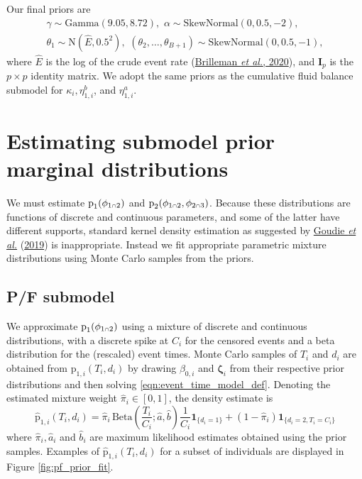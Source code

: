 \documentclass[
  10pt,
  a4paper,
]{article}
\let\Oldcap\cap
\renewcommand{\cap}{\mathrel{\mathsmaller{\Oldcap}}}
\newcommand{\pd}{\text{p}}
\begin{document}
Our final priors are \begin{equation}
\begin{gathered}
  \gamma \sim \text{Gamma}(9.05, 8.72), \, \,
  \alpha \sim \text{SkewNormal}(0, 0.5, -2), \\
  \theta_{1} \sim \text{N}(\hat{E}, 0.5^2), \, \,
  (\theta_{2}, \ldots, \theta_{B + 1}) \sim \text{SkewNormal}(0, 0.5, -1),
  \label{eqn:surv-submodel-prior-def}
\end{gathered}
\end{equation} where \(\hat{E}\) is the log of the crude event rate
(\protect\hyperlink{ref-brilleman_bayesian_2020}{Brilleman \emph{et
al.}, 2020}), and \(\boldsymbol{I}_{p}\) is the \(p \times p\) identity
matrix. We adopt the same priors as the cumulative fluid balance
submodel for \(\kappa_{i}, \eta_{1, i}^{b}\), and \(\eta_{1, i}^{a}\).

\hypertarget{estimating-submodel-prior-marginal-distributions}{%
\section{Estimating submodel prior marginal
distributions}\label{estimating-submodel-prior-marginal-distributions}}

We must estimate \(\pd_{1}(\phi_{1 \cap 2})\) and
\(\pd_{2}(\phi_{1 \cap 2}, \phi_{2 \cap 3})\). Because these
distributions are functions of discrete and continuous parameters, and
some of the latter have different supports, standard kernel density
estimation as suggested by
\protect\hyperlink{ref-goudie_joining_2019}{Goudie \emph{et al.}}
(\protect\hyperlink{ref-goudie_joining_2019}{2019}) is inappropriate.
Instead we fit appropriate parametric mixture distributions using Monte
Carlo samples from the priors.

\hypertarget{pf-submodel}{%
\subsection{P/F submodel}\label{pf-submodel}}

We approximate \(\pd_{1}(\phi_{1 \cap 2})\) using a mixture of discrete
and continuous distributions, with a discrete spike at \(C_{i}\) for the
censored events and a beta distribution for the (rescaled) event times.
Monte Carlo samples of \(T_{i}\) and \(d_{i}\) are obtained from
\(\pd_{1, i}(T_{i}, d_{i})\) by drawing \(\beta_{0, i}\) and
\(\boldsymbol{\zeta}_{i}\) from their respective prior distributions and
then solving \eqref{eqn:event_time_model_def}. Denoting the estimated
mixture weight \(\widehat{\pi}_{i} \in [0, 1]\), the density estimate is
\begin{equation}
  \widehat{\pd}_{1, i}(T_{i}, d_{i}) =
    \widehat{\pi}_{i} \, \text{Beta}\left(\frac{T_{i}}{C_{i}}; \widehat{a}, \widehat{b}\right) \frac{1}{C_{i}} \boldsymbol{1}_{\{d_{i} = 1\}} +
    (1 - \widehat{\pi}_{i}) \boldsymbol{1}_{\{d_{i} = 2, T_{i} = C_{i}\}}
  \label{eqn:pf-event-time-prior-dist}
\end{equation} where \(\widehat{\pi}_{i}, \widehat{a}_{i}\) and
\(\widehat{b}_{i}\) are maximum likelihood estimates obtained using the
prior samples. Examples of \(\widehat{\pd}_{1, i}(T_{i}, d_{i})\) for a
subset of individuals are displayed in Figure \ref{fig:pf_prior_fit}.
\end{document}
